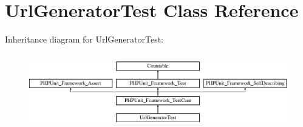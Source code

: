 \section{Url\+Generator\+Test Class Reference}
\label{class_symfony_1_1_component_1_1_routing_1_1_tests_1_1_generator_1_1_url_generator_test}
Inheritance diagram for Url\+Generator\+Test\+:\begin{figure}[H]
\begin{center}
\leavevmode
\includegraphics[height=3.303835cm]{class_symfony_1_1_component_1_1_routing_1_1_tests_1_1_generator_1_1_url_generator_test}
\end{center}
\end{figure}
